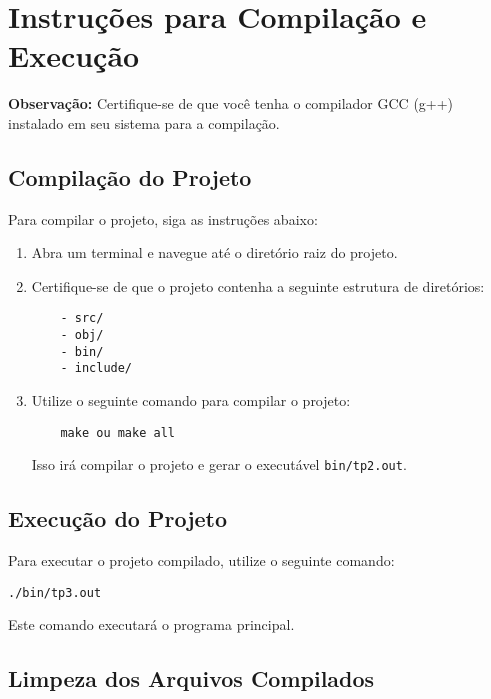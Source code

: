 \documentclass{article}
\begin{document}
\appendix
\newpage
\section{Instruções para Compilação e Execução}
\label{ap:compilacao_execucao}

\textbf{Observação:} Certifique-se de que você tenha o compilador GCC (g++) instalado em seu sistema para a compilação.

\subsection{Compilação do Projeto}

Para compilar o projeto, siga as instruções abaixo:

\begin{enumerate}
    \item Abra um terminal e navegue até o diretório raiz do projeto.
    \item Certifique-se de que o projeto contenha a seguinte estrutura de diretórios:
    
    \begin{verbatim}
    - src/
    - obj/
    - bin/
    - include/
    \end{verbatim}

    \item Utilize o seguinte comando para compilar o projeto:

    \begin{verbatim}
    make ou make all
    \end{verbatim}

    Isso irá compilar o projeto e gerar o executável \texttt{bin/tp2.out}.

\end{enumerate}

\subsection{Execução do Projeto}

Para executar o projeto compilado, utilize o seguinte comando:

\begin{verbatim}
./bin/tp3.out
\end{verbatim}

Este comando executará o programa principal.


\subsection{Limpeza dos Arquivos Compilados}
\end{document}
